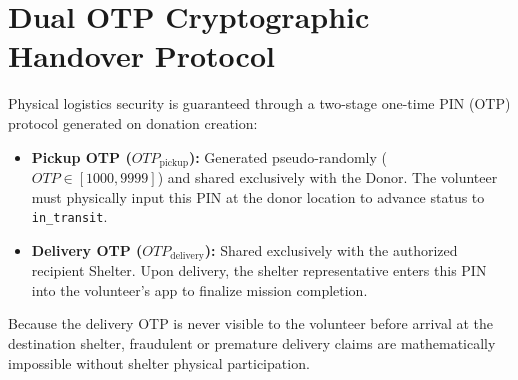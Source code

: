\section{Dual OTP Cryptographic Handover Protocol}
Physical logistics security is guaranteed through a two-stage one-time PIN (OTP) protocol generated on donation creation:
\begin{itemize}
    \item \textbf{Pickup OTP ($OTP_{\text{pickup}}$):} Generated pseudo-randomly ($OTP \in [1000, 9999]$) and shared exclusively with the Donor. The volunteer must physically input this PIN at the donor location to advance status to \texttt{in\_transit}.
    \item \textbf{Delivery OTP ($OTP_{\text{delivery}}$):} Shared exclusively with the authorized recipient Shelter. Upon delivery, the shelter representative enters this PIN into the volunteer's app to finalize mission completion.
\end{itemize}

\begin{summarybox}
Because the delivery OTP is never visible to the volunteer before arrival at the destination shelter, fraudulent or premature delivery claims are mathematically impossible without shelter physical participation.
\end{summarybox}

